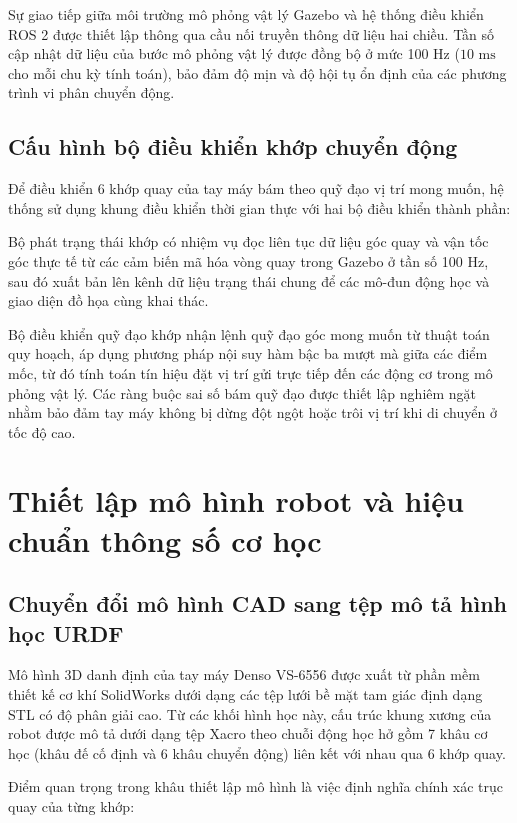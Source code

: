 Sự giao tiếp giữa môi trường mô phỏng vật lý Gazebo và hệ thống điều khiển ROS 2 được thiết lập thông qua cầu nối truyền thông dữ liệu hai chiều. Tần số cập nhật dữ liệu của bước mô phỏng vật lý được đồng bộ ở mức 100 Hz ($10\text{ ms}$ cho mỗi chu kỳ tính toán), bảo đảm độ mịn và độ hội tụ ổn định của các phương trình vi phân chuyển động.

\subsection{Cấu hình bộ điều khiển khớp chuyển động}

Để điều khiển 6 khớp quay của tay máy bám theo quỹ đạo vị trí mong muốn, hệ thống sử dụng khung điều khiển thời gian thực với hai bộ điều khiển thành phần:

Bộ phát trạng thái khớp có nhiệm vụ đọc liên tục dữ liệu góc quay và vận tốc góc thực tế từ các cảm biến mã hóa vòng quay trong Gazebo ở tần số 100 Hz, sau đó xuất bản lên kênh dữ liệu trạng thái chung để các mô-đun động học và giao diện đồ họa cùng khai thác.

Bộ điều khiển quỹ đạo khớp nhận lệnh quỹ đạo góc mong muốn từ thuật toán quy hoạch, áp dụng phương pháp nội suy hàm bậc ba mượt mà giữa các điểm mốc, từ đó tính toán tín hiệu đặt vị trí gửi trực tiếp đến các động cơ trong mô phỏng vật lý. Các ràng buộc sai số bám quỹ đạo được thiết lập nghiêm ngặt nhằm bảo đảm tay máy không bị dừng đột ngột hoặc trôi vị trí khi di chuyển ở tốc độ cao.

\section{Thiết lập mô hình robot và hiệu chuẩn thông số cơ học}
\label{sec:robot_model_calibration}

\subsection{Chuyển đổi mô hình CAD sang tệp mô tả hình học URDF}

Mô hình 3D danh định của tay máy Denso VS-6556 được xuất từ phần mềm thiết kế cơ khí SolidWorks dưới dạng các tệp lưới bề mặt tam giác định dạng STL có độ phân giải cao. Từ các khối hình học này, cấu trúc khung xương của robot được mô tả dưới dạng tệp Xacro theo chuỗi động học hở gồm 7 khâu cơ học (khâu đế cố định và 6 khâu chuyển động) liên kết với nhau qua 6 khớp quay.

Điểm quan trọng trong khâu thiết lập mô hình là việc định nghĩa chính xác trục quay của từng khớp:

